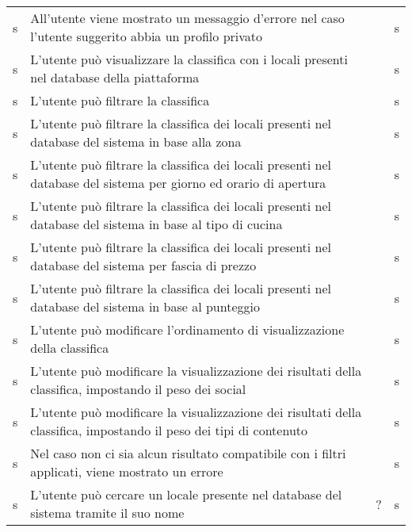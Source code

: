 \begin{longtable}{ m{}<{\centering}  m{}<{\centering}  m{}<{\centering}  m{}<{\centering}}
	 s & All’utente viene mostrato un messaggio d’errore nel caso l’utente suggerito abbia un profilo privato & \De & s\\	
	 
	 \rowcolor{gray!25} s & L’utente può visualizzare la classifica con i locali presenti nel database della piattaforma & \Ob & s\\	
	 
	 s & L’utente può filtrare la classifica & \Ob & s\\		
	 
	 \rowcolor{gray!25} s & L’utente può filtrare la classifica dei locali presenti nel database del sistema in base alla zona & \De & s\\	
	 
	 s & L’utente può filtrare la classifica dei locali presenti nel database del sistema per giorno ed orario di apertura & \De & s\\	
	 
	 \rowcolor{gray!25} s & L’utente può filtrare la classifica dei locali presenti nel database del sistema in base al tipo di cucina & \De & s\\	
	 
	 s & L’utente può filtrare la classifica dei locali presenti nel database del sistema per fascia di prezzo & \De & s\\	 
	 
	 \rowcolor{gray!25} s & L’utente può filtrare la classifica dei locali presenti nel database del sistema in base al punteggio & \De & s\\	 
	 
	 s & L’utente può modificare l’ordinamento di visualizzazione della classifica & \De & s\\	
	 
	 \rowcolor{gray!25} s & L’utente può modificare la visualizzazione dei risultati della classifica, impostando il peso dei social & \De & s\\	 
	 
	 s & L’utente può modificare la visualizzazione dei risultati della classifica, impostando il peso dei tipi di contenuto & \De & s\\	 
	 
	\rowcolor{gray!25} s & Nel caso non ci sia alcun risultato compatibile con i filtri applicati, viene mostrato un errore & \De & s\\	 
	 
	 s & L’utente può cercare un locale presente nel database del sistema tramite il suo nome & \De ? & s\\	 
	 

\end{longtable}
